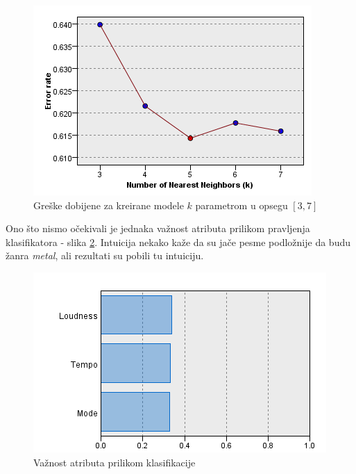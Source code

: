 \begin{figure}[H]
    \centering
    \includegraphics{resources/KNN_errors.PNG}
    \caption{Gre\v{s}ke dobijene za kreirane modele $k$ parametrom u opsegu $[3,7]$}
    \label{fig:KNNgreske}
\end{figure}

Ono \v{s}to nismo o\v{c}ekivali je jednaka va\v{z}nost atributa prilikom pravljenja klasifikatora - slika \ref{fig:KNNvaznost}. Intuicija nekako ka\v{z}e da su ja\v{c}e pesme podlo\v{z}nije da budu \v{z}anra \emph{metal}, ali rezultati su pobili tu intuiciju.

\begin{figure}[H]
    \centering
    \includegraphics[scale=0.7]{resources/KNN_pred_imp.PNG}
    \caption{Va\v{z}nost atributa prilikom klasifikacije}
    \label{fig:KNNvaznost}
\end{figure}
